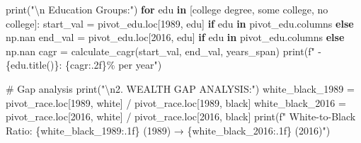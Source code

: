 \documentclass[
  letterpaper,
  DIV=11,
  numbers=noendperiod]{scrartcl}
\newenvironment{Shaded}{\begin{snugshade}}{\end{snugshade}}
\newcommand{\BuiltInTok}[1]{\textcolor[rgb]{0.00,0.23,0.31}{#1}}
\newcommand{\CharTok}[1]{\textcolor[rgb]{0.13,0.47,0.30}{#1}}
\newcommand{\CommentTok}[1]{\textcolor[rgb]{0.37,0.37,0.37}{#1}}
\newcommand{\ControlFlowTok}[1]{\textcolor[rgb]{0.00,0.23,0.31}{\textbf{#1}}}
\newcommand{\DecValTok}[1]{\textcolor[rgb]{0.68,0.00,0.00}{#1}}
\newcommand{\KeywordTok}[1]{\textcolor[rgb]{0.00,0.23,0.31}{\textbf{#1}}}
\newcommand{\NormalTok}[1]{\textcolor[rgb]{0.00,0.23,0.31}{#1}}
\newcommand{\OperatorTok}[1]{\textcolor[rgb]{0.37,0.37,0.37}{#1}}
\newcommand{\SpecialCharTok}[1]{\textcolor[rgb]{0.37,0.37,0.37}{#1}}
\newcommand{\SpecialStringTok}[1]{\textcolor[rgb]{0.13,0.47,0.30}{#1}}
\newcommand{\StringTok}[1]{\textcolor[rgb]{0.13,0.47,0.30}{#1}}
\begin{document}
\begin{Shaded}
\begin{Highlighting}[]
\BuiltInTok{print}\NormalTok{(}\StringTok{"}\CharTok{\textbackslash{}n}\StringTok{   Education Groups:"}\NormalTok{)}
\ControlFlowTok{for}\NormalTok{ edu }\KeywordTok{in}\NormalTok{ [}\StringTok{\textquotesingle{}college degree\textquotesingle{}}\NormalTok{, }\StringTok{\textquotesingle{}some college\textquotesingle{}}\NormalTok{, }\StringTok{\textquotesingle{}no college\textquotesingle{}}\NormalTok{]:}
\NormalTok{    start\_val }\OperatorTok{=}\NormalTok{ pivot\_edu.loc[}\DecValTok{1989}\NormalTok{, edu] }\ControlFlowTok{if}\NormalTok{ edu }\KeywordTok{in}\NormalTok{ pivot\_edu.columns }\ControlFlowTok{else}\NormalTok{ np.nan}
\NormalTok{    end\_val }\OperatorTok{=}\NormalTok{ pivot\_edu.loc[}\DecValTok{2016}\NormalTok{, edu] }\ControlFlowTok{if}\NormalTok{ edu }\KeywordTok{in}\NormalTok{ pivot\_edu.columns }\ControlFlowTok{else}\NormalTok{ np.nan}
\NormalTok{    cagr }\OperatorTok{=}\NormalTok{ calculate\_cagr(start\_val, end\_val, years\_span)}
    \BuiltInTok{print}\NormalTok{(}\SpecialStringTok{f"   {-} }\SpecialCharTok{\{}\NormalTok{edu}\SpecialCharTok{.}\NormalTok{title()}\SpecialCharTok{\}}\SpecialStringTok{: }\SpecialCharTok{\{}\NormalTok{cagr}\SpecialCharTok{:.2f\}}\SpecialStringTok{\% per year"}\NormalTok{)}

\CommentTok{\# Gap analysis}
\BuiltInTok{print}\NormalTok{(}\StringTok{"}\CharTok{\textbackslash{}n}\StringTok{2. WEALTH GAP ANALYSIS:"}\NormalTok{)}
\NormalTok{white\_black\_1989 }\OperatorTok{=}\NormalTok{ pivot\_race.loc[}\DecValTok{1989}\NormalTok{, }\StringTok{\textquotesingle{}white\textquotesingle{}}\NormalTok{] }\OperatorTok{/}\NormalTok{ pivot\_race.loc[}\DecValTok{1989}\NormalTok{, }\StringTok{\textquotesingle{}black\textquotesingle{}}\NormalTok{]}
\NormalTok{white\_black\_2016 }\OperatorTok{=}\NormalTok{ pivot\_race.loc[}\DecValTok{2016}\NormalTok{, }\StringTok{\textquotesingle{}white\textquotesingle{}}\NormalTok{] }\OperatorTok{/}\NormalTok{ pivot\_race.loc[}\DecValTok{2016}\NormalTok{, }\StringTok{\textquotesingle{}black\textquotesingle{}}\NormalTok{]}
\BuiltInTok{print}\NormalTok{(}\SpecialStringTok{f"   White{-}to{-}Black Ratio: }\SpecialCharTok{\{}\NormalTok{white\_black\_1989}\SpecialCharTok{:.1f\}}\SpecialStringTok{ (1989) → }\SpecialCharTok{\{}\NormalTok{white\_black\_2016}\SpecialCharTok{:.1f\}}\SpecialStringTok{ (2016)"}\NormalTok{)}


\end{Highlighting}
\end{Shaded}
\end{document}
